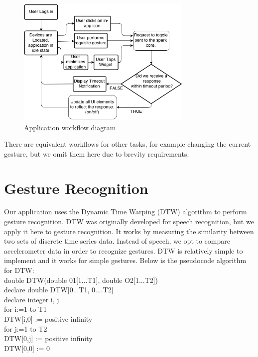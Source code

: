 \documentclass[journal]{IEEEtran}
\begin{document}
\begin{figure}[!t]
\centering
\includegraphics[width=3.3in]{Workflow.png}
\caption{Application workflow diagram}
\label{workflow}
\end{figure}





There are equivalent workflows for other tasks, for example changing the current gesture, but we omit them here due to brevity requirements. 

\section{Gesture Recognition}

Our application uses the Dynamic Time Warping (DTW)\cite{DTWalgorithm} algorithm to perform gesture recognition. DTW was originally developed for speech recognition, but we apply it here to gesture recognition. It works by measuring the similarity between two sets of discrete time series data. Instead of speech, we opt to compare accelerometer data in order to recognize gestures. DTW is relatively simple to implement and it works for simple gestures. Below is the pseudocode algorithm\cite{DTWarticle} for DTW:\\

\noindent 
	double DTW(double 01[1...T1], double O2[1...T2])\\
 	\hspace*{0.25cm}declare double DTW[0...T1, 0....T2]\\
 	\hspace*{0.25cm}declare integer i, j\\
 	
 	\noindent 
 	\hspace*{0.25cm}for i:=1 to T1\\
 	\hspace*{0.5cm}DTW[i,0] := positive infinity\\
 	\hspace*{0.25cm}for j:=1 to T2\\
 	\hspace*{0.5cm}DTW[0,j] := positive infinity\\
 	\hspace*{0.25cm}DTW[0,0] := 0\\
 	
\end{document}
